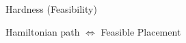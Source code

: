 \begin{frame}{Hardness \small (Feasibility)}

\onslide<+>
\onslide<+>
\begin{figure}
\centering

\end{figure}

\onslide<+>
\begin{center}
Hamiltonian path $\iff$ Feasible Placement
\end{center}
\end{frame}
